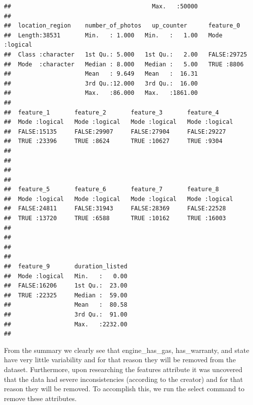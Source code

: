 \documentclass[
]{article}
\begin{document}
\begin{verbatim}
##                                        Max.   :50000                  
##                                                                       
##  location_region    number_of_photos   up_counter      feature_0      
##  Length:38531       Min.   : 1.000   Min.   :   1.00   Mode :logical  
##  Class :character   1st Qu.: 5.000   1st Qu.:   2.00   FALSE:29725    
##  Mode  :character   Median : 8.000   Median :   5.00   TRUE :8806     
##                     Mean   : 9.649   Mean   :  16.31                  
##                     3rd Qu.:12.000   3rd Qu.:  16.00                  
##                     Max.   :86.000   Max.   :1861.00                  
##                                                                       
##  feature_1       feature_2       feature_3       feature_4      
##  Mode :logical   Mode :logical   Mode :logical   Mode :logical  
##  FALSE:15135     FALSE:29907     FALSE:27904     FALSE:29227    
##  TRUE :23396     TRUE :8624      TRUE :10627     TRUE :9304     
##                                                                 
##                                                                 
##                                                                 
##                                                                 
##  feature_5       feature_6       feature_7       feature_8      
##  Mode :logical   Mode :logical   Mode :logical   Mode :logical  
##  FALSE:24811     FALSE:31943     FALSE:28369     FALSE:22528    
##  TRUE :13720     TRUE :6588      TRUE :10162     TRUE :16003    
##                                                                 
##                                                                 
##                                                                 
##                                                                 
##  feature_9       duration_listed  
##  Mode :logical   Min.   :   0.00  
##  FALSE:16206     1st Qu.:  23.00  
##  TRUE :22325     Median :  59.00  
##                  Mean   :  80.58  
##                  3rd Qu.:  91.00  
##                  Max.   :2232.00  
## 
\end{verbatim}

From the summary we clearly see that engine\_has\_gas, has\_warranty,
and state have very little variability and for that reason they will be
removed from the dataset. Furthermore, upon researching the features
attribute it was uncovered that the data had severe inconsistencies
(according to the creator) and for that reason they will be removed. To
accomplish this, we run the select command to remove these attributes.
\end{document}
